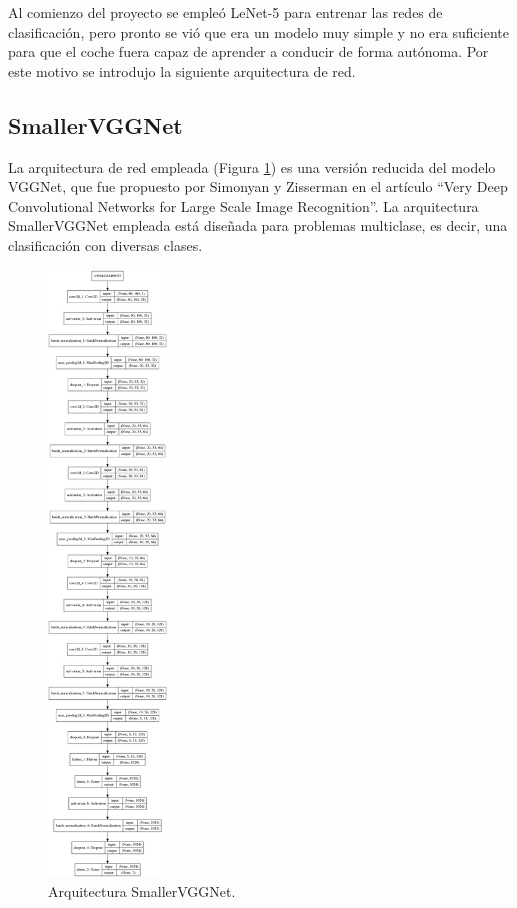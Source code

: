 Al comienzo del proyecto se empleó LeNet-5 para entrenar las redes de clasificación, pero pronto se vió que era un modelo muy simple y no era suficiente para que el coche fuera capaz de aprender a conducir de forma autónoma. Por este motivo se introdujo la siguiente arquitectura de red.

\subsection{SmallerVGGNet}

La arquitectura de red empleada \cite{smallerVggNet} (Figura \ref{fig.SmallerVGGNet}) es una versión reducida del modelo VGGNet, que fue propuesto por Simonyan y Zisserman en el artículo ``Very Deep Convolutional Networks for Large Scale Image Recognition''. La arquitectura SmallerVGGNet empleada está diseñada para problemas multiclase, es decir, una clasificación con diversas clases. \\

\begin{figure}
\begin{center}
	\includegraphics[width=0.28\textwidth]{figures/Clasificacion/model_smallervgg.png}
   \caption{Arquitectura SmallerVGGNet.}
	\label{fig.SmallerVGGNet}
\end{center}
\end{figure}

